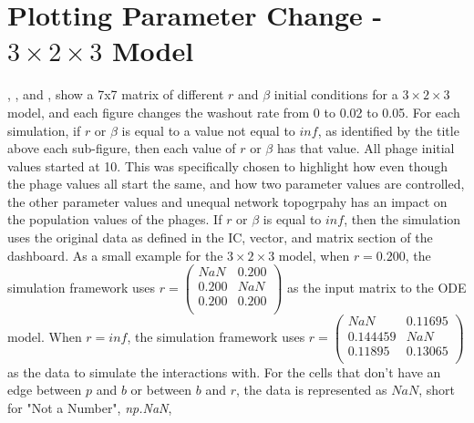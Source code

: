 \section{Plotting Parameter Change - $3\times 2\times 3$ Model}
, , and , show a 7x7 matrix of different $r$ and $\beta$ initial conditions for a $3\times2\times3$ model, and each figure changes the washout rate from 0 to 0.02 to 0.05. 
For each simulation, if $r$ or $\beta$ is equal to a value not equal to $inf$, as identified by the title above each sub-figure, then each value of $r$ or $\beta$ has that value.
All phage initial values started at 10. 
This was specifically chosen to highlight how even though the phage values all start the same, and how two parameter values are controlled, the other parameter values and unequal network topogrpahy has an impact on the population values of the phages. 
If $r$ or $\beta$ is equal to $inf$, then the simulation uses the original data as defined in the IC, vector, and matrix section of the dashboard. 
As a small example for the $3\times 2\times 3$ model, when $r=0.200$, the simulation framework uses $r = \left(\begin{smallmatrix} NaN & 0.200 \\ 0.200 & NaN \\ 0.200 & 0.200 \\ \end{smallmatrix}\right)$ as the input matrix to the ODE model. 
When $r=inf$, the simulation framework uses $r=\left(\begin{smallmatrix} NaN & 0.11695 \\ 0.144459 & NaN \\ 0.11895 & 0.13065 \\ \end{smallmatrix}\right)$ as the data to simulate the interactions with. 
For the cells that don't have an edge between $p$ and $b$ or between $b$ and $r$, the data is represented as $NaN$, short for "Not a Number", \textit{np.NaN}, 


